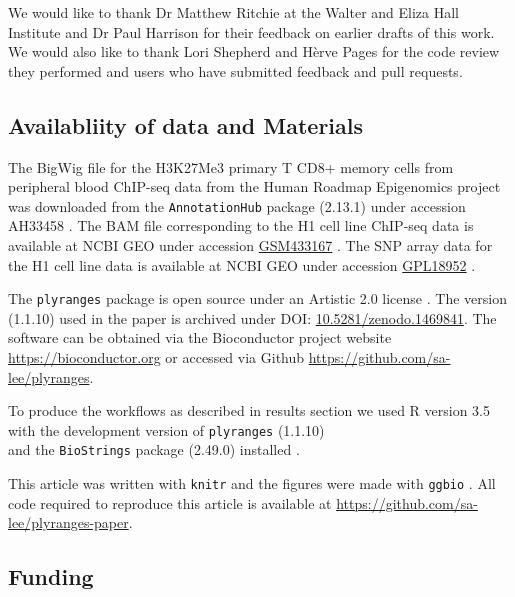 \documentclass[]{article}
\begin{document}
We would like to thank Dr Matthew Ritchie at the Walter and Eliza Hall
Institute and Dr Paul Harrison for their feedback on earlier drafts of
this work. We would also like to thank Lori Shepherd and Hèrve Pages for
the code review they performed and users who have submitted feedback and
pull requests.

\hypertarget{availabliity-of-data-and-materials}{%
\subsection{Availabliity of data and
Materials}\label{availabliity-of-data-and-materials}}

The BigWig file for the H3K27Me3 primary T CD8+ memory cells from
peripheral blood ChIP-seq data from the Human Roadmap Epigenomics
project\\
was downloaded from the \texttt{AnnotationHub} package (2.13.1) under
accession AH33458 \cite{R-ahub, Roadmap-Epigenomics-Consortium2015-pr}.
The BAM file corresponding to the H1 cell line ChIP-seq data is
available at NCBI GEO under accession
\href{https://www.ncbi.nlm.nih.gov/geo/query/acc.cgi?acc=GSM433167}{GSM433167}
\cite{ncbi-geo, Roadmap-Epigenomics-Consortium2015-pr}. The SNP array
data for the H1 cell line data is available at NCBI GEO under accession
\href{https://www.ncbi.nlm.nih.gov/geo/query/acc.cgi?acc=GPL18952}{GPL18952}
\cite{Roadmap-Epigenomics-Consortium2015-pr}.

The \texttt{plyranges} package is open source under an Artistic 2.0
license \cite{R-plyranges-z}. The version (1.1.10) used in the paper is
archived under DOI:
\href{https://doi.org/10.5281/zenodo.1469841}{10.5281/zenodo.1469841}.
The software can be obtained via the Bioconductor project website
\url{https://bioconductor.org} or accessed via Github
\url{https://github.com/sa-lee/plyranges}.

To produce the workflows as described in results section we used R
version 3.5 with the development version of \texttt{plyranges}
(1.1.10)\\
and the \texttt{BioStrings} package (2.49.0) installed
\cite{r-core, R-plyranges-z, R-biostrings}.

This article was written with \texttt{knitr} \cite{R-knitr} and the
figures were made with \texttt{ggbio} \cite{R-ggbio}. All code required
to reproduce this article is available at
\url{https://github.com/sa-lee/plyranges-paper}.

\hypertarget{funding}{%
\subsection{Funding}\label{funding}}
\end{document}
